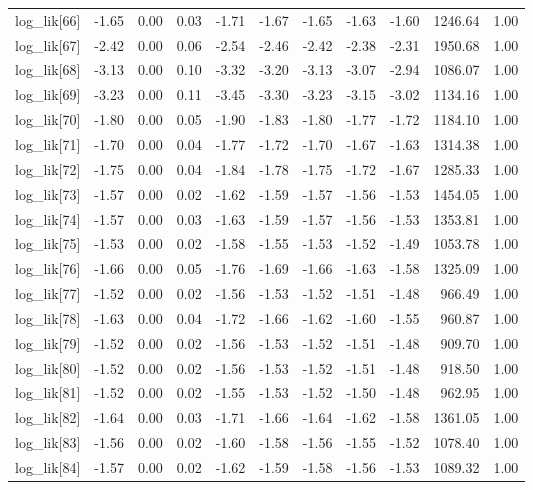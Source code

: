 \begin{table}[ht]
\begin{tabular}{rrrrrrrrrrr}
  log\_lik[66] & -1.65 & 0.00 & 0.03 & -1.71 & -1.67 & -1.65 & -1.63 & -1.60 & 1246.64 & 1.00 \\ 
  log\_lik[67] & -2.42 & 0.00 & 0.06 & -2.54 & -2.46 & -2.42 & -2.38 & -2.31 & 1950.68 & 1.00 \\ 
  log\_lik[68] & -3.13 & 0.00 & 0.10 & -3.32 & -3.20 & -3.13 & -3.07 & -2.94 & 1086.07 & 1.00 \\ 
  log\_lik[69] & -3.23 & 0.00 & 0.11 & -3.45 & -3.30 & -3.23 & -3.15 & -3.02 & 1134.16 & 1.00 \\ 
  log\_lik[70] & -1.80 & 0.00 & 0.05 & -1.90 & -1.83 & -1.80 & -1.77 & -1.72 & 1184.10 & 1.00 \\ 
  log\_lik[71] & -1.70 & 0.00 & 0.04 & -1.77 & -1.72 & -1.70 & -1.67 & -1.63 & 1314.38 & 1.00 \\ 
  log\_lik[72] & -1.75 & 0.00 & 0.04 & -1.84 & -1.78 & -1.75 & -1.72 & -1.67 & 1285.33 & 1.00 \\ 
  log\_lik[73] & -1.57 & 0.00 & 0.02 & -1.62 & -1.59 & -1.57 & -1.56 & -1.53 & 1454.05 & 1.00 \\ 
  log\_lik[74] & -1.57 & 0.00 & 0.03 & -1.63 & -1.59 & -1.57 & -1.56 & -1.53 & 1353.81 & 1.00 \\ 
  log\_lik[75] & -1.53 & 0.00 & 0.02 & -1.58 & -1.55 & -1.53 & -1.52 & -1.49 & 1053.78 & 1.00 \\ 
  log\_lik[76] & -1.66 & 0.00 & 0.05 & -1.76 & -1.69 & -1.66 & -1.63 & -1.58 & 1325.09 & 1.00 \\ 
  log\_lik[77] & -1.52 & 0.00 & 0.02 & -1.56 & -1.53 & -1.52 & -1.51 & -1.48 & 966.49 & 1.00 \\ 
  log\_lik[78] & -1.63 & 0.00 & 0.04 & -1.72 & -1.66 & -1.62 & -1.60 & -1.55 & 960.87 & 1.00 \\ 
  log\_lik[79] & -1.52 & 0.00 & 0.02 & -1.56 & -1.53 & -1.52 & -1.51 & -1.48 & 909.70 & 1.00 \\ 
  log\_lik[80] & -1.52 & 0.00 & 0.02 & -1.56 & -1.53 & -1.52 & -1.51 & -1.48 & 918.50 & 1.00 \\ 
  log\_lik[81] & -1.52 & 0.00 & 0.02 & -1.55 & -1.53 & -1.52 & -1.50 & -1.48 & 962.95 & 1.00 \\ 
  log\_lik[82] & -1.64 & 0.00 & 0.03 & -1.71 & -1.66 & -1.64 & -1.62 & -1.58 & 1361.05 & 1.00 \\ 
  log\_lik[83] & -1.56 & 0.00 & 0.02 & -1.60 & -1.58 & -1.56 & -1.55 & -1.52 & 1078.40 & 1.00 \\ 
  log\_lik[84] & -1.57 & 0.00 & 0.02 & -1.62 & -1.59 & -1.58 & -1.56 & -1.53 & 1089.32 & 1.00 \\ 

\end{tabular}
\end{table}
